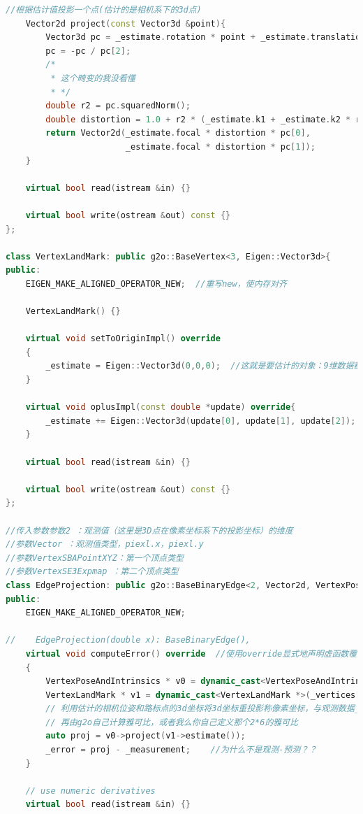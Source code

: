 \documentclass[40pt,a4paper，UTF8]{ctexart}
\numberwithin{equation}{section}
\begin{document}
\begin{lstlisting}[language=C++, caption=BAL\_g2o核心代码]
    //根据估计值投影一个点(估计的是相机系下的3d点)
    Vector2d project(const Vector3d &point){
        Vector3d pc = _estimate.rotation * point + _estimate.translation;
        pc = -pc / pc[2];
        /*
         * 这个畸变的我没看懂
         * */
        double r2 = pc.squaredNorm();
        double distortion = 1.0 + r2 * (_estimate.k1 + _estimate.k2 * r2);
        return Vector2d(_estimate.focal * distortion * pc[0],
                        _estimate.focal * distortion * pc[1]);
    }

    virtual bool read(istream &in) {}

    virtual bool write(ostream &out) const {}
};

class VertexLandMark: public g2o::BaseVertex<3, Eigen::Vector3d>{
public:
    EIGEN_MAKE_ALIGNED_OPERATOR_NEW;  //重写new，使内存对齐

    VertexLandMark() {}

    virtual void setToOriginImpl() override
    {
        _estimate = Eigen::Vector3d(0,0,0);  //这就是要估计的对象：9维数据都需要被估计
    }

    virtual void oplusImpl(const double *update) override{
        _estimate += Eigen::Vector3d(update[0], update[1], update[2]);
    }

    virtual bool read(istream &in) {}

    virtual bool write(ostream &out) const {}
};

//传入参数参数2 ：观测值（这里是3D点在像素坐标系下的投影坐标）的维度
//参数Vector ：观测值类型，piexl.x，piexl.y
//参数VertexSBAPointXYZ：第一个顶点类型
//参数VertexSE3Expmap ：第二个顶点类型
class EdgeProjection: public g2o::BaseBinaryEdge<2, Vector2d, VertexPoseAndIntrinsics, VertexLandMark>{
public:
    EIGEN_MAKE_ALIGNED_OPERATOR_NEW;

//    EdgeProjection(double x): BaseBinaryEdge(),
    virtual void computeError() override  //使用override显式地声明虚函数覆盖
    {
        VertexPoseAndIntrinsics * v0 = dynamic_cast<VertexPoseAndIntrinsics *>(_vertices[0]);  //读取位姿9维顶点
        VertexLandMark * v1 = dynamic_cast<VertexLandMark *>(_vertices[1]);  //读取位姿9维顶点
        // 利用估计的相机位姿和路标点的3d坐标将3d坐标重投影称像素坐标，与观测数据_measurement(实际上就是传进来的Vector2d)计算error，
        // 再由g2o自己计算雅可比，或者我么你自己定义那个2*6的雅可比
        auto proj = v0->project(v1->estimate());
        _error = proj - _measurement;    //为什么不是观测-预测？？
    }

    // use numeric derivatives
    virtual bool read(istream &in) {}


\end{lstlisting}
\end{document}
